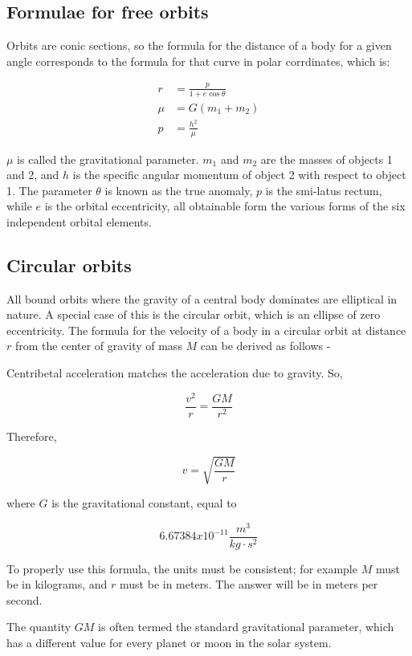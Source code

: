 \documentclass[12pt]{article}
\begin{document}
\subsection{Formulae for free orbits}

Orbits are conic sections, so the formula for the distance of a body for a given angle corresponds to the formula for that curve in polar corrdinates, which is:

\begin{align*}
  r &= \frac{p}{1+e\cos\theta} \\
  \mu &= G(m_1+m_2) \\
  p &=\frac{h^2}{\mu}
\end{align*}

\(\mu\) is called the gravitational parameter. \(m_1\) and \(m_2\) are the masses of objects 1 and 2, and \(h\) is the specific angular momentum of object 2 with respect to object 1. The parameter \(\theta\) is known as the true anomaly, \(p\) is the smi-latus rectum, while \(e\) is the orbital eccentricity, all obtainable form the various forms of the six independent orbital elements.

\subsection{Circular orbits}

All bound orbits where the gravity of a central body dominates are elliptical in nature. A special case of this is the circular orbit, which is an ellipse of zero eccentricity. The formula for the velocity of a body in a circular orbit at distance \(r\) from the center of gravity of mass \(M\) can be derived as follows -

Centribetal acceleration matches the acceleration due to gravity. So,

\[\frac{v^{2}}{r}=\frac{GM}{r^{2}}\]

Therefore,

\[v=\sqrt{\frac{GM}{r}}\]

where \(G\) is the gravitational constant, equal to

\[6.67384x10^{-11}\frac{m^{3}}{kg\cdot s^2}\]

To properly use this formula, the units must be consistent; for example \(M\) must be in kilograms, and \(r\) must be in meters. The answer will be in meters per second.

The quantity \(GM\) is often termed the standard gravitational parameter, which has a different value for every planet or moon in the solar system.
\end{document}
